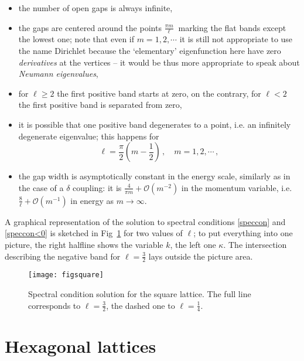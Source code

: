 \documentclass[english]{elsarticle}
\begin{document}
\begin{itemize}

\item the number of open gaps is always infinite,

\item the gaps are centered around the points $\frac{\pi m}{\ell}\:$ marking the flat bands except the lowest one; note that even if $m=1,2,\cdots$ it is still not appropriate to use the name Dirichlet because the `elementary' eigenfunction here have zero \emph{derivatives} at the vertices -- it would be thus more appropriate to speak about \emph{Neumann eigenvalues},

\item for $\ell\ge 2$ the first positive band starts at zero, on the contrary, for $\ell<2$ the first positive band is separated from zero,

\item it is possible that one positive band degenerates to a point, i.e. an infinitely degenerate eigenvalue; this happens for
$$
\ell = \frac{\pi}{2}\left( m-\frac12 \right)\,,\quad m=1,2,\cdots\,,
$$

\item the gap width is asymptotically constant in the energy scale, similarly as in the case of a $\delta$ coupling: it is $\frac{4}{\pi m} +
\mathcal{O}(m^{-2})$ in the momentum variable, i.e. $\frac{8}{\ell} + \mathcal{O}(m^{-1})$ in energy as $m\to\infty$.

\end{itemize}

\noindent A graphical representation of the solution to spectral
conditions \eqref{speccon} and \eqref{speccon<0} is sketched in
Fig~\ref{soln_square} for two values of $\ell$; to put everything
into one picture, the right halfline shows the variable $k$, the
left one $\kappa$. The intersection describing the negative band
for $\ell=\frac32$ lays outside the picture area.
\begin{figure}[htbp]
     \centering
     \texttt{[image: figsquare]}
     \caption{Spectral condition solution for the square lattice. The full line corresponds to $\ell=\frac32$, the dashed one to $\ell=\frac14$.}\label{soln_square}
\end{figure}


\section{Hexagonal lattices} \label{s:hexagon}
\end{document}
